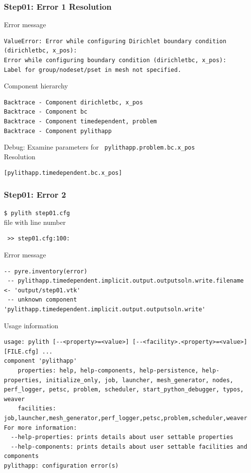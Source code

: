 \documentclass{beamer}
\newcommand{\cmd}[1]{{\tiny\tt \color{ltred}#1}}
\newcommand{\errlabel}[1]{{\small \color{blue}#1}}
\newcommand{\debuginfo}[1]{{\small \color{green}#1}}
\begin{document}
\begin{frame}[fragile]
  \frametitle{Step01: Error 1 Resolution}

\errlabel{Error message}
\begin{lstlisting}
ValueError: Error while configuring Dirichlet boundary condition (dirichletbc, x_pos):
Error while configuring boundary condition (dirichletbc, x_pos):
Label for group/nodeset/pset in mesh not specified.
\end{lstlisting}
\errlabel{Component hierarchy}
\begin{lstlisting}
Backtrace - Component dirichletbc, x_pos
Backtrace - Component bc
Backtrace - Component timedependent, problem
Backtrace - Component pylithapp
\end{lstlisting}\pause
\errlabel{Debug:} \debuginfo{Examine parameters for {\tt
    pylithapp.problem.bc.x\_pos}}\pause\\
\errlabel{Resolution}
\begin{lstlisting}
[pylithapp.timedependent.bc.x_pos]
\end{lstlisting}


\end{frame}


\begin{frame}[fragile]
  \frametitle{Step01: Error 2}

\cmd{\$ pylith step01.cfg}\\
\errlabel{{\tt .cfg} file with line number}
\begin{lstlisting}
 >> step01.cfg:100:
\end{lstlisting}
\errlabel{Error message}
\begin{lstlisting}
-- pyre.inventory(error)
 -- pylithapp.timedependent.implicit.output.outputsoln.write.filename <- 'output/step01.vtk'
 -- unknown component
'pylithapp.timedependent.implicit.output.outputsoln.write'
\end{lstlisting}
\errlabel{Usage information}
\begin{lstlisting}
usage: pylith [--<property>=<value>] [--<facility>.<property>=<value>] [FILE.cfg] ...
component 'pylithapp'
    properties: help, help-components, help-persistence, help-properties, initialize_only, job, launcher, mesh_generator, nodes, perf_logger, petsc, problem, scheduler, start_python_debugger, typos, weaver
    facilities: job,launcher,mesh_generator,perf_logger,petsc,problem,scheduler,weaver
For more information:
  --help-properties: prints details about user settable properties
  --help-components: prints details about user settable facilities and components
pylithapp: configuration error(s)
\end{lstlisting}
  
\end{frame}
\end{document}
